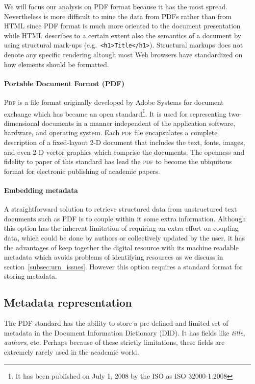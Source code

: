 We will focus our analysis on \textsc{PDF} format because it has the most spread. Nevertheless is more difficult to mine the data from \textsc{PDF}s rather than from \textsc{HTML} since \textsc{PDF} format is much more oriented to the document presentation while \textsc{HTML} describes to a certain extent also the semantics of a document by using structural mark-ups (e.g.\ \texttt{<h1>Title</h1>}). Structural markups does not denote any specific rendering altough most Web browsers have standardized on how elements should be formatted.

\paragraph{Portable Document Format \textsc(PDF)}\textsc{Pdf} is a file format originally developed by Adobe Systems for document exchange which has became an open standard\footnote{It has been published on July 1, 2008 by the ISO as ISO 32000-1:2008}. It is used for representing two-dimensional documents in a manner independent of the application software, hardware, and operating system. Each \textsc{pdf} file encapsulates a complete description of a fixed-layout 2-D document that includes the text, fonts, images, and even 2-D vector graphics which comprise the documents. The openness and fidelity to paper of this standard has lead the \textsc{pdf} to become the ubiquitous format for electronic publishing of academic papers.

\paragraph{Embedding metadata}A straightforward solution to retrieve structured data from unstructured text documents such as \textsc{PDF} is to couple within it some extra information. Although this option has the inherent limitation of requiring an extra effort on coupling data, which could be done by authors or collectively updated by the user, it has the advantages of keep together the digital resource with its machine readable metadata which avoids problems of identifying resources as we discuss in section~\ref{subsec:urn_issues}. However this option requires a standard format for storing metadata.

\subsection{\label{subsec:metadata}Metadata representation}

The \textsc{PDF} standard has the ability to store a pre-defined and limited set of metadata in the Document Information Dictionary (DID). It has fields like \emph{title}, \emph{authors}, etc.  Perhaps because of these strictly limitations, these fields are extremely rarely used in the academic world.

